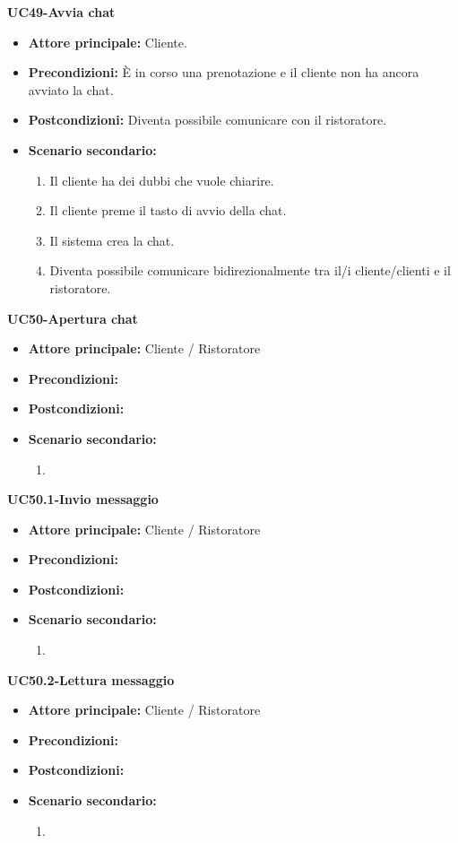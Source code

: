 
\textbf{UC49-Avvia chat}
\begin{itemize}
\item \textbf{Attore principale:} Cliente.
\item \textbf{Precondizioni:} È in corso una prenotazione e il cliente non ha ancora avviato la chat. %
\item \textbf{Postcondizioni:} Diventa possibile comunicare con il ristoratore.
\item \textbf{Scenario secondario:}
\begin{enumerate}
    \item Il cliente ha dei dubbi che vuole chiarire.
    \item Il cliente preme il tasto di avvio della chat.
    \item Il sistema crea la chat.
    \item Diventa possibile comunicare bidirezionalmente tra il/i cliente/clienti e il ristoratore. 
\end{enumerate}
\end{itemize}

\textbf{UC50-Apertura chat}
\begin{itemize}
\item \textbf{Attore principale:} Cliente / Ristoratore
\item \textbf{Precondizioni:}
\item \textbf{Postcondizioni:}
\item \textbf{Scenario secondario:}
\begin{enumerate}
    \item
\end{enumerate}
\end{itemize}

\textbf{UC50.1-Invio messaggio}
\begin{itemize}
\item \textbf{Attore principale:} Cliente / Ristoratore
\item \textbf{Precondizioni:}
\item \textbf{Postcondizioni:}
\item \textbf{Scenario secondario:}
\begin{enumerate}
    \item
\end{enumerate}
\end{itemize}

\textbf{UC50.2-Lettura messaggio}
\begin{itemize}
\item \textbf{Attore principale:} Cliente / Ristoratore
\item \textbf{Precondizioni:}
\item \textbf{Postcondizioni:}
\item \textbf{Scenario secondario:}
\begin{enumerate}
    \item
\end{enumerate}
\end{itemize}
